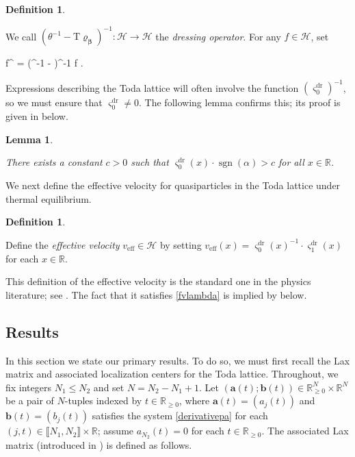 \documentclass{amsart}
\numberwithin{equation}{section}
\DeclareMathOperator{\dr}{dr}
\DeclareMathOperator{\eff}{eff}
\DeclareMathOperator{\sgn}{sgn}
\newtheorem{lem}[thm]{Lemma}
\theoremstyle{remark}
\theoremstyle{definition}
\newtheorem{definition}[thm]{Definition}
\begin{document}
	
	\begin{definition}
		\label{fdr} 
		
		We call $(\theta^{-1} - \bm{\mathrm{T}} \bm{\varrho_{\beta}})^{-1} : \mathcal{H} \rightarrow \mathcal{H}$ the \emph{dressing operator}. For any $f \in \mathcal{H}$, set
		\begin{flalign*}
			f^{\dr} = (\theta^{-1} -  \bm{\varrho_{\beta}})^{-1} f \in {}.
		\end{flalign*}
		
	\end{definition} 
	
	Expressions describing the Toda lattice will often involve the function $(\varsigma_0^{\dr})^{-1}$, so we must ensure that $\varsigma_0^{\dr} \ne 0$. The following lemma confirms this; its proof is given in  below.
	
	\begin{lem}
		\label{positive0}
		
		There exists a constant $c > 0$ such that $\varsigma_0^{\dr} (x) \cdot \sgn(\alpha) > c$ for all $x \in \mathbb{R}$.  
	\end{lem}
	
	We next define the effective velocity for quasiparticles in the Toda lattice under thermal equilibrium.
	
	\begin{definition}
		\label{v} 
		
		Define the \emph{effective velocity} $v_{\eff} \in \mathcal{H}$ by setting $v_{\eff} (x) = \varsigma_0^{\dr} (x)^{-1} \cdot \varsigma_1^{\dr} (x)$ for each $x \in \mathbb{R}$.
		
	\end{definition}
	
	This definition of the effective velocity is the standard one in the physics literature; see \cite[Equation (6.20)]{HSIMS}. The fact that it satisfies \eqref{fvlambda} is implied by  below.
	
	
	
	\subsection{Results}
	
	\label{MatrixL} 
	
	In this section we state our primary results. To do so, we must first recall the Lax matrix and associated localization centers for the Toda lattice. Throughout, we fix integers $N_1 \le N_2$ and set $N = N_2 - N_1 + 1$. Let $( \bm{a}(t); \bm{b}(t) ) \in \mathbb{R}_{\ge 0}^N \times \mathbb{R}^N$ be a pair of $N$-tuples indexed by $t \in \mathbb{R}_{\ge 0}$, where $\bm{a}(t) = ( a_j (t) )$ and $\bm{b}(t) = ( b_j (t) )$ satisfies the system \eqref{derivativepa} for each $(j, t) \in \llbracket N_1, N_2 \rrbracket \times \mathbb{R}$; assume $a_{N_2}(t) = 0$ for each $t \in \mathbb{R}_{\ge 0}$. The associated Lax matrix (introduced in \cite{LEI,CIS}) is defined as follows.
	
\end{document}
